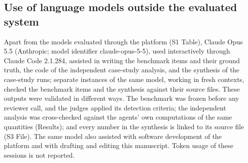 \subsection*{Use of language models outside the evaluated system}

Apart from the models evaluated through the platform (S1 Table), Claude Opus 5.5 (Anthropic; model identifier claude-opus-5-5), used interactively through Claude Code 2.1.284, assisted in writing the benchmark items and their ground truth, the code of the independent case-study analysis, and the synthesis of the case-study runs; separate instances of the same model, working in fresh contexts, checked the benchmark items and the synthesis against their source files. These outputs were validated in different ways. The benchmark was frozen before any reviewer call, and the judges applied its detection criteria; the independent analysis was cross-checked against the agents' own computations of the same quantities (Results); and every number in the synthesis is linked to its source file (S3 File). The same model also assisted with software development of the platform and with drafting and editing this manuscript. Token usage of these sessions is not reported.
